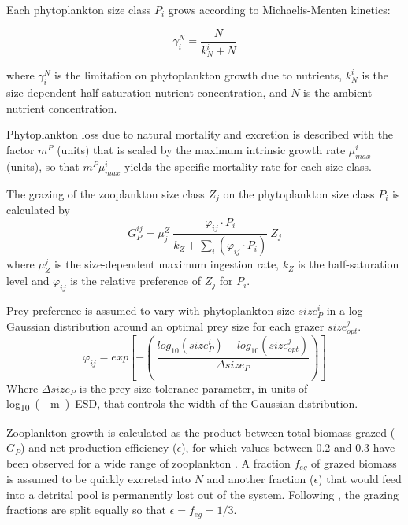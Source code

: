 \documentclass[journal abbreviation, manuscript]{copernicus}
\begin{document}
Each phytoplankton size class $P_i$ grows according to Michaelis-Menten kinetics:

\begin{equation}
    \gamma_i^N =  \frac{N}{k_N^i + N} 
\end{equation}

where $\gamma_i^N$ is the limitation on phytoplankton growth due to nutrients, $k_N^i$ is the size-dependent half saturation nutrient concentration, and $N$ is the ambient nutrient concentration.

Phytoplankton loss due to natural mortality and excretion is described with the factor $m^P$ (units) that is scaled by the maximum intrinsic growth rate $\mu_{max}^i$ (units), so that $m^P \mu_{max}^i$ yields the specific mortality rate for each size class.

The grazing of the zooplankton size class $Z_j$ on the phytoplankton size class $P_i$ is calculated by
\begin{equation}
    G_P^{ij} = \mu_j^Z \ \frac{ \varphi_{ij} \cdot P_i }{ k_Z + \sum_{i}(\varphi_{ij} \cdot P_i) } \ Z_j
\end{equation}
where $\mu_Z^j$ is the size-dependent maximum ingestion rate, $k_Z$ is the half-saturation level and $\varphi_{ij}$ is the relative preference of $Z_j$ for $P_i$.

Prey preference is assumed to vary with phytoplankton size $size_{P}^i$ in a log-Gaussian distribution around an optimal prey size for each grazer $size_{opt}^j$.
\begin{equation}
    \varphi_{ij} = exp \left[ -\left( \ \frac{ log_{10}(size_P^i) - log_{10}(size_{opt}^j) }{ \Delta size_{P} } \right) \right]
\end{equation}
Where $\Delta size_{P}$ is the prey size tolerance parameter, in units of \unit{log_{10}(\mu m) ESD}, that controls the width of the Gaussian distribution.

Zooplankton growth is calculated as the product between total biomass grazed ($G_P$) and net production efficiency ($\epsilon$), for which values between 0.2 and 0.3 have been observed for a wide range of zooplankton \citep{Straile1997GrossGroup}. A fraction $f_{eg}$ of grazed biomass is assumed to be quickly excreted into $N$ and another fraction ($\epsilon$) that would feed into a detrital pool is permanently lost out of the system. Following \citet{Banas2011b}, the grazing fractions are split equally  so that $\epsilon = f_{eg} = 1/3$.
\end{document}
